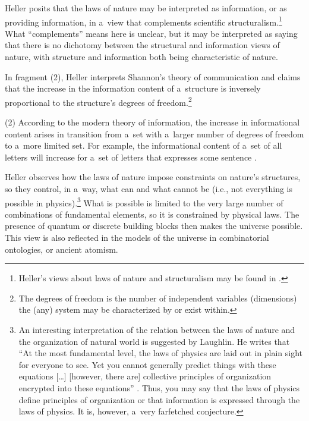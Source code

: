 Heller posits that the laws of nature may be interpreted as information, or as providing information, in a~view that complements scientific structuralism.\footnote{Heller's views about laws of nature and structuralism may be found in 
\parencite[][]{heller_filozofia_2009}.%
} What ``complements'' means here is unclear, but it may be interpreted as saying that there is no dichotomy between the structural and information views of nature, with structure and information both being characteristic of nature.



In fragment (2), Heller interprets Shannon's theory of communication and claims that the increase in the information content of a~structure is inversely proportional to the structure's degrees of freedom.\footnote{The degrees of freedom is the number of independent variables (dimensions) the (any) system may be characterized by or exist within.}



(2) According to the modern theory of information, the increase in informational content arises in transition from a~set with a~larger number of degrees of freedom to a~more limited set. For example, the informational content of a~set of all letters will increase for a~set of letters that expresses some sentence 
\parencite[][pp.62–63]{heller_filozofia_2009}.%




Heller observes how the laws of nature impose constraints on nature's structures, so they control, in a~way, what can and what cannot be (i.e., not everything is possible in physics).\footnote{An interesting interpretation of the relation between the laws of nature and the organization of natural world is suggested by Laughlin. He writes that ``At the most fundamental level, the laws of physics are laid out in plain sight for everyone to see. Yet you cannot generally predict things with these equations […] [however, there are] collective principles of organization encrypted into these equations'' 
\parencite[][p.36]{laughlin_crime_2008}. %
 Thus, you may say that the laws of physics define principles of organization or that information is expressed through the laws of physics. It is, however, a~very farfetched conjecture.} What is possible is limited to the very large number of combinations of fundamental elements, so it is constrained by physical laws. The presence of quantum or discrete building blocks then makes the universe possible. This view is also reflected in the models of the universe in combinatorial ontologies, or ancient atomism.



